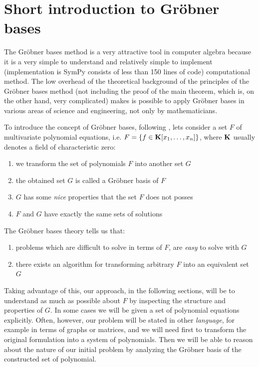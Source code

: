 \section{Short introduction to Gröbner bases}

The Gröbner bases method is a very attractive tool in computer algebra because it is a very
simple to understand and relatively simple to implement (implementation is SymPy consists of less
than 150 lines of code) computational method. The low overhead of the theoretical background of
the principles of the Gröbner bases method (not including the proof of the main theorem, which
is, on the other hand, very complicated) makes is possible to apply Gröbner bases in various
areas of science and engineering, not only by mathematicians.

To introduce the concept of Gröbner bases, following \cite{Buchberger2001systems}, lets consider
a set $F$ of multivariate polynomial equations, i.e. $F = \{ f \in \mathbf{K}[x_1, \ldots, x_n] \}$, where $\mathbf{K}$ usually
denotes a field of characteristic zero:
\begin{enumerate}
\item {} 
we transform the set of polynomials $F$ into another set $G$

\item {} 
the obtained set $G$ is called a Gröbner basis of $F$

\item {} 
$G$ has some \emph{nice} properties that the set $F$ does not posses

\item {} 
$F$ and $G$ have exactly the same sets of solutions

\end{enumerate}

The Gröbner bases theory tells us that:
\begin{enumerate}
\item {} 
problems which are difficult to solve in terms of $F$, are \emph{easy} to solve with $G$

\item {} 
there exists an algorithm for transforming arbitrary $F$ into an equivalent set $G$

\end{enumerate}

Taking advantage of this, our approach, in the following sections, will be to understand as much as
possible about $F$ by inspecting the structure and properties of $G$. In some cases we will be given a
set of polynomial equations explicitly. Often, however, our problem will be stated in other \emph{language},
for example in terms of graphs or matrices, and we will need first to transform the original formulation
into a system of polynomials. Then we will be able to reason about the nature of our initial problem by
analyzing the Gröbner basis of the constructed set of polynomial.
